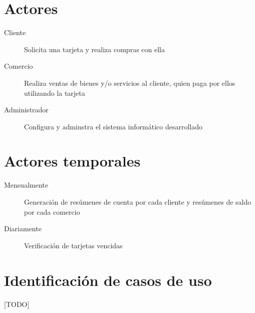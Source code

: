 \section{Actores}

\begin{description}
  \item[Cliente] Solicita una tarjeta y realiza compras con ella
  \item[Comercio] Realiza ventas de bienes y/o servicios al cliente, quien paga por ellos utilizando la tarjeta
  \item[Administrador] Configura y adminstra el sistema informático desarrollado
\end{description}

\section{Actores temporales}

\begin{description}
  \item[Mensualmente] Generación de resúmenes de cuenta por cada cliente y resúmenes de saldo por cada comercio
  \item[Diariamente] Verificación de tarjetas vencidas
\end{description}

\section{Identificación de casos de uso}

[TODO]

